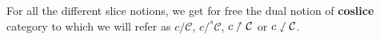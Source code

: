 \begin{rem}
    For all the different slice notions, we get for free the dual notion of \textbf{coslice} category to which we will refer as $c/\mathcal{C}$\label{nomencl:coslice}, $c/^s\mathcal{C}$\label{nomencl:strict-coslice}, $c\nnearrow\mathcal{C}$\label{nomencl:lax-coslice} or $c\sswarrow\mathcal{C}$\label{nomencl:oplax-coslice}.
\end{rem}


